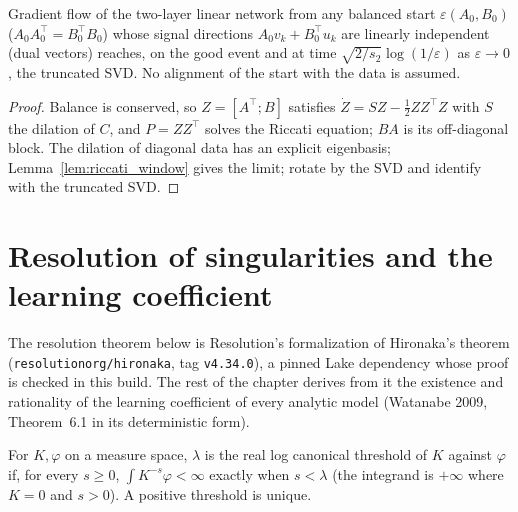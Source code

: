 \begin{theorem}\label{thm:balanced_plateau}
\leanok
Gradient flow of the two-layer linear network from any balanced start $\varepsilon(A_0,B_0)$
($A_0A_0^\top=B_0^\top B_0$) whose signal directions $A_0v_k+B_0^\top u_k$ are linearly independent
(dual vectors) reaches, on the good event and at time $\sqrt{2/s_2}\log(1/\varepsilon)$ as
$\varepsilon\to0$, the truncated SVD. No alignment of the start with the data is assumed.
\end{theorem}
\begin{proof}
\leanok
Balance is conserved, so $Z=[A^\top;B]$ satisfies $\dot Z=SZ-\tfrac12ZZ^\top Z$ with $S$ the dilation of
$C$, and $P=ZZ^\top$ solves the Riccati equation; $BA$ is its off-diagonal block. The dilation of
diagonal data has an explicit eigenbasis; Lemma~\ref{lem:riccati_window} gives the limit; rotate by
the SVD and identify with the truncated SVD.
\end{proof}

\chapter{Resolution of singularities and the learning coefficient}

The resolution theorem below is Resolution's formalization of Hironaka's theorem
(\texttt{resolutionorg/hironaka}, tag \texttt{v4.34.0}), a pinned Lake dependency whose proof is
checked in this build. The rest of the chapter derives from it the existence and rationality of the
learning coefficient of every analytic model (Watanabe 2009, Theorem~6.1 in its deterministic form).

\begin{definition}\label{def:rlct}
\leanok
For $K,\varphi$ on a measure space, $\lambda$ is the real log canonical threshold of $K$ against
$\varphi$ if, for every $s\ge0$, $\int K^{-s}\varphi<\infty$ exactly when $s<\lambda$ (the integrand
is $+\infty$ where $K=0$ and $s>0$). A positive threshold is unique.
\end{definition}

